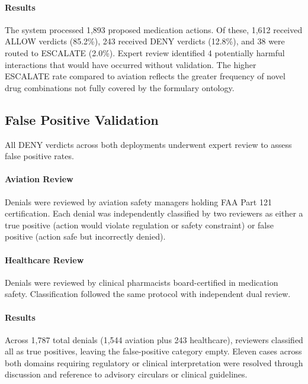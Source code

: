 \documentclass[sigconf,nonacm]{acmart}
\begin{document}
\paragraph{Results} The system processed 1,893 proposed medication actions. Of these, 1,612 received ALLOW verdicts (85.2\%), 243 received DENY verdicts (12.8\%), and 38 were routed to ESCALATE (2.0\%). Expert review identified 4 potentially harmful interactions that would have occurred without validation. The higher ESCALATE rate compared to aviation reflects the greater frequency of novel drug combinations not fully covered by the formulary ontology.

\subsection{False Positive Validation}

All DENY verdicts across both deployments underwent expert review to assess false positive rates.

\paragraph{Aviation Review} Denials were reviewed by aviation safety managers holding FAA Part 121 certification. Each denial was independently classified by two reviewers as either a true positive (action would violate regulation or safety constraint) or false positive (action safe but incorrectly denied).

\paragraph{Healthcare Review} Denials were reviewed by clinical pharmacists board-certified in medication safety. Classification followed the same protocol with independent dual review.

\paragraph{Results} Across 1,787 total denials (1,544 aviation plus 243 healthcare), reviewers classified all as true positives, leaving the false-positive category empty. Eleven cases across both domains requiring regulatory or clinical interpretation were resolved through discussion and reference to advisory circulars or clinical guidelines.
\end{document}
